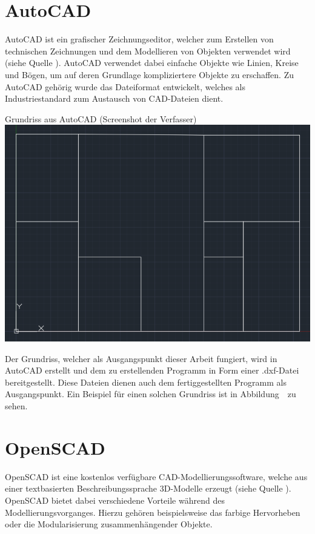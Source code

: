 \section{AutoCAD}
AutoCAD ist ein grafischer Zeichnungseditor, welcher zum Erstellen von technischen Zeichnungen und dem Modellieren von Objekten verwendet wird (siehe Quelle \cite{autocadwiki}).
AutoCAD verwendet dabei einfache Objekte wie Linien, Kreise und Bögen, um auf deren Grundlage kompliziertere Objekte zu erschaffen.
Zu AutoCAD gehörig wurde das Dateiformat  entwickelt, welches als Industriestandard zum Austausch von CAD-Dateien dient. \\
\begin{Bild}{Grundriss aus AutoCAD (Screenshot der Verfasser)}
	\includegraphics[width=\textwidth]{Bilder/Grundriss}
\end{Bild}
Der Grundriss, welcher als Ausgangspunkt dieser Arbeit fungiert, wird in AutoCAD erstellt und dem zu erstellenden Programm in Form einer .dxf-Datei bereitgestellt.
Diese Dateien dienen auch dem fertiggestellten Programm als Ausgangspunkt.
Ein Beispiel für einen solchen Grundriss ist in Abbildung~\thebildnr\ zu sehen.

\section{OpenSCAD}
OpenSCAD ist eine kostenlos verfügbare CAD-Modellierungssoftware, welche aus einer textbasierten Beschreibungssprache 3D-Modelle erzeugt (siehe Quelle \cite{OpenScad}).
OpenSCAD bietet dabei verschiedene Vorteile während des Modellierungsvorganges.
Hierzu gehören beispielsweise das farbige Hervorheben oder die Modularisierung zusammenhängender Objekte. \\

